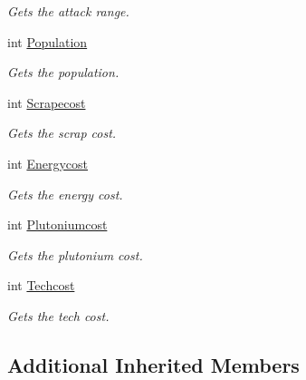 \begin{DoxyCompactItemize}
\begin{DoxyCompactList}\small\item\em Gets the attack range. \end{DoxyCompactList}\item 
int \hyperlink{classCore_1_1Models_1_1Definitions_1_1UnitDefinition_a748b77e28ada4746ed63b0f02e3500b0}{Population}
\begin{DoxyCompactList}\small\item\em Gets the population. \end{DoxyCompactList}\item 
int \hyperlink{classCore_1_1Models_1_1Definitions_1_1UnitDefinition_a3f72b3b6dc4fdffa692d7545fd2fac6e}{Scrapecost}
\begin{DoxyCompactList}\small\item\em Gets the scrap cost. \end{DoxyCompactList}\item 
int \hyperlink{classCore_1_1Models_1_1Definitions_1_1UnitDefinition_a0b9702e7e97e0038bc52cff2276a1846}{Energycost}
\begin{DoxyCompactList}\small\item\em Gets the energy cost. \end{DoxyCompactList}\item 
int \hyperlink{classCore_1_1Models_1_1Definitions_1_1UnitDefinition_acf9bdfe102042bfc92207d6e08fcf995}{Plutoniumcost}
\begin{DoxyCompactList}\small\item\em Gets the plutonium cost. \end{DoxyCompactList}\item 
int \hyperlink{classCore_1_1Models_1_1Definitions_1_1UnitDefinition_a33eddf22531ef2f351a5efd21733c276}{Techcost}
\begin{DoxyCompactList}\small\item\em Gets the tech cost. \end{DoxyCompactList}\end{DoxyCompactItemize}
\subsection*{Additional Inherited Members}


